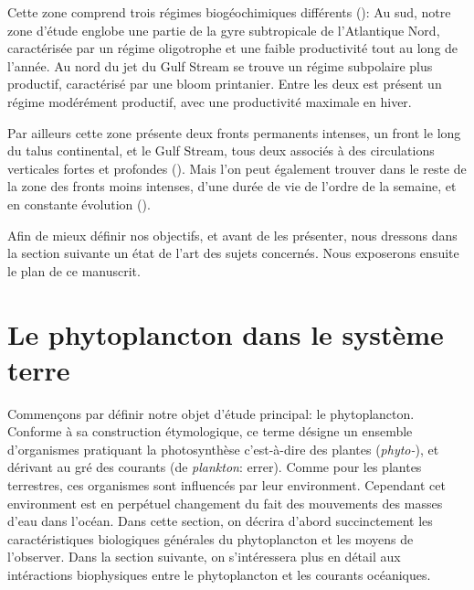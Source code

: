 Cette zone comprend trois régimes biogéochimiques différents (\cite{bock_2022}):
Au sud, notre zone d'étude englobe une partie de la gyre subtropicale de l'Atlantique Nord, caractérisée par un régime oligotrophe et une faible productivité tout au long de l'année.
Au nord du jet du Gulf Stream se trouve un régime subpolaire plus productif, caractérisé par une bloom printanier.
Entre les deux est présent un régime modérément productif, avec une productivité maximale en hiver.

Par ailleurs cette zone présente deux fronts permanents intenses, un front le long du talus continental, et le Gulf Stream, tous deux associés à des circulations verticales fortes et profondes (\cite{flagg_2006,liao_2022}).
Mais l'on peut également trouver dans le reste de la zone des fronts moins intenses, d'une durée de vie de l'ordre de la semaine, et en constante évolution (\cite{drushka_2019,sanchez-rios_2020}).

Afin de mieux définir nos objectifs, et avant de les présenter, nous dressons dans la section suivante un état de l'art des sujets concernés.
Nous exposerons ensuite le plan de ce manuscrit.

\section{Le phytoplancton dans le système terre}
\label{sec:phyto-ds-sys-terre}


Commençons par définir notre objet d'étude principal: le phytoplancton.
Conforme à sa construction étymologique, ce terme désigne un ensemble d'organismes pratiquant la photosynthèse c'est-à-dire des plantes (\emph{phyto-}), et dérivant au gré des courants (de \emph{plankton}: errer).
Comme pour les plantes terrestres, ces organismes sont influencés par leur environment.
Cependant cet environment est en perpétuel changement du fait des mouvements des masses d'eau dans l'océan.
Dans cette section, on décrira d'abord succinctement les caractéristiques biologiques générales du phytoplancton et les moyens de l'observer.
Dans la section suivante, on s'intéressera plus en détail aux intéractions biophysiques entre le phytoplancton et les courants océaniques.

